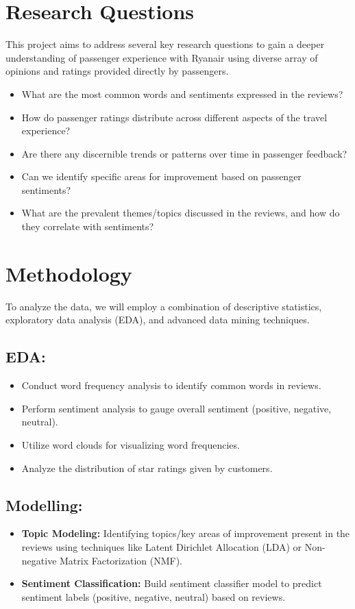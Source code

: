 \documentclass[11pt]{article} %
\begin{document}
\section{Research Questions}
This project aims to address several key research questions to gain a deeper understanding of passenger experience with Ryanair using diverse array of opinions and ratings provided directly by passengers.
\begin{itemize}
\item What are the most common words and sentiments expressed in the reviews?
\item How do passenger ratings distribute across different aspects of the travel experience?
\item Are there any discernible trends or patterns over time in passenger feedback?
\item Can we identify specific areas for improvement based on passenger sentiments?
\item What are the prevalent themes/topics discussed in the reviews, and how do they correlate with sentiments?
\end{itemize}

\section{Methodology}
To analyze the data, we will employ a combination of descriptive statistics, exploratory data analysis (EDA), and advanced data mining techniques.

\subsection*{EDA:}
\begin{itemize}
        \item Conduct word frequency analysis to identify common words in reviews.
        \item Perform sentiment analysis to gauge overall sentiment (positive, negative, neutral).
        \item Utilize word clouds for visualizing word frequencies.
        \item Analyze the distribution of star ratings given by customers.
\end{itemize}

\subsection*{Modelling:}
\begin{itemize}
    \item \textbf{Topic Modeling:} Identifying topics/key areas of improvement present in the reviews using techniques like Latent Dirichlet Allocation (LDA) or Non-negative Matrix Factorization (NMF).
    \item \textbf{Sentiment Classification:} Build sentiment classifier model to predict sentiment labels (positive, negative, neutral) based on reviews.
\end{itemize}
\end{document}
